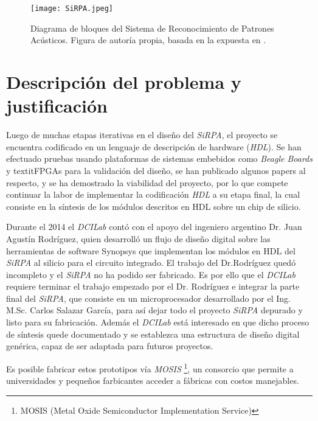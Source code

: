 \begin{figure}[h]
\texttt{[image: SiRPA.jpeg]}
\centering
\caption{Diagrama de bloques del Sistema de Reconocimiento de Patrones Acústicos. Figura de autoría propia, basada en la expuesta en \cite{Carlosthesis}.}
\label{sirpa}
\end{figure}


\section{Descripción del problema y justificación}

Luego de muchas etapas iterativas en el diseño del \textit{SiRPA}, el proyecto se encuentra codificado en un lenguaje de descripción de hardware (\textit{HDL}). Se han efectuado pruebas usando plataformas de sistemas embebidos como \textit{Beagle Boards} y textit{FPGAs}  para la validación del diseño, se han publicado algunos papers al respecto, y se ha demostrado la viabilidad del proyecto, por lo que compete continuar la labor de
implementar la codificación \textit{HDL} a su etapa final, la cual consiste en la síntesis de los módulos descritos en HDL sobre un chip de silicio.

Durante el 2014 el \textit{DCILab} contó con el apoyo del ingeniero argentino Dr. Juan Agustín Rodríguez, quien desarrolló un flujo de diseño digital sobre las herramientas de software Synopsys que implementan los módulos en HDL del \textit{SiRPA} al silicio para el circuito integrado. El trabajo del Dr.Rodríguez quedó incompleto y el \textit{SiRPA} no ha podido ser fabricado. Es por ello que el \textit{DCILab} requiere terminar el trabajo empezado por el Dr. Rodríguez e integrar la parte final del \textit{SiRPA}, que consiste en un microprocesador desarrollado por el Ing. M.Sc. Carlos Salazar García, para así dejar todo el proyecto \textit{SiRPA} depurado y listo para su fabricación. Además el \textit{DCILab} está interesado en que dicho proceso de síntesis quede documentado y se establezca una estructura de diseño digital genérica, capaz de ser adaptada para futuros proyectos.


Es posible fabricar estos prototipos vía \textit{MOSIS} \footnote{MOSIS (Metal Oxide Semiconductor Implementation Service)}, un consorcio que permite a universidades y pequeños farbicantes acceder a fábricas con costos manejables. \cite{website:mosis}

